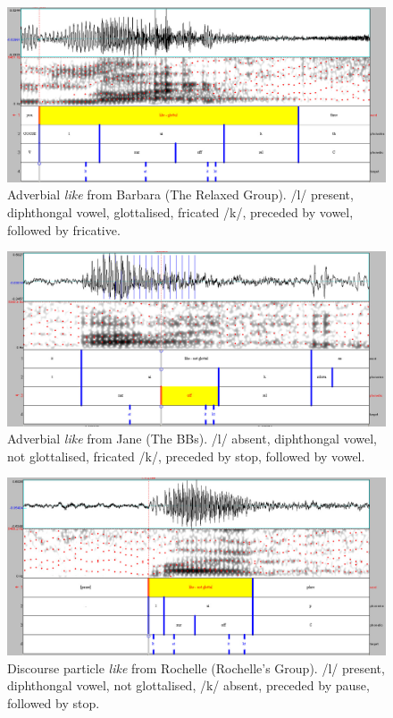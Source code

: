 \begin{figure}
	\centering
		\includegraphics[width=5in]{images/barbara19.jpg}
	\caption{Adverbial \textit{like} from Barbara (The Relaxed Group). /l/ pre\-sent, diph\-thongal vowel, glottalised, fricated /k/, preceded by vowel, followed by fricative.}
	\label{fig:barbara19}
\end{figure}

\begin{figure}
	\centering
		\includegraphics[width=5in]{images/jane37.jpg}
	\caption{Adverbial \textit{like} from Jane (The BBs).  /l/ absent, diphthongal vowel, not glottalised, fricated /k/, preceded by stop, followed by vowel.}
	\label{fig:jane37}
\end{figure}

\begin{figure}
	\centering
		\includegraphics[width=5in]{images/rochelle2.jpg}
	\caption{Discourse particle \textit{like} from Rochelle (Rochelle's Group).  /l/ present, diphthongal vowel, not glottalised, /k/ absent, preceded by pause, followed by stop.}
	\label{fig:rochelle2}
\end{figure}

